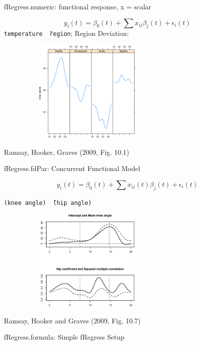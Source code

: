 \documentclass[compress]{beamer}
\begin{document}

\begin{frame}{fRegress.numeric:  functional response, x = scalar}

\[ y_i(t) = \beta_0(t) + \sum x_{ij} \beta_j(t) + \epsilon_i(t) \]
\texttt{temperature \~\ region};  Region Deviation:  

\includegraphics[height=5cm, width=9cm]{figs/tempregionbeta2}

Ramsay, Hooker, Graves (2009, Fig. 10.1)

\end{frame}


\begin{frame}{fRegress.fdPar:  Concurrent Functional Model}

\[ y_i(t) = \beta_0(t) + \sum x_{ij}(t) \beta_j(t) + \epsilon_i(t) \]

\texttt{(knee angle) \~\ (hip angle)} 

\includegraphics[height=5cm, width=9cm]{figs/gaitregression1}

Ramsay, Hooker and Graves (2009, Fig. 10.7)

\end{frame}


\begin{frame}{fRegress.formula:  Simple fRegress Setup}

\end{frame}
\end{document}
